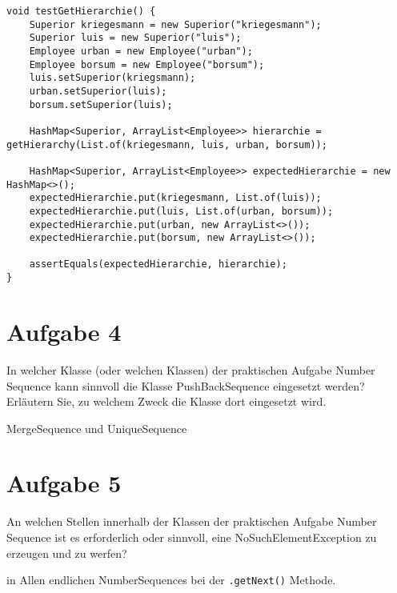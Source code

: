 \begin{lstlisting}
void testGetHierarchie() {
    Superior kriegesmann = new Superior("kriegesmann");
    Superior luis = new Superior("luis");
    Employee urban = new Employee("urban");
    Employee borsum = new Employee("borsum");
    luis.setSuperior(kriegsmann);
    urban.setSuperior(luis);
    borsum.setSuperior(luis);

    HashMap<Superior, ArrayList<Employee>> hierarchie = getHierarchy(List.of(kriegesmann, luis, urban, borsum));
    
    HashMap<Superior, ArrayList<Employee>> expectedHierarchie = new HashMap<>();
    expectedHierarchie.put(kriegesmann, List.of(luis));
    expectedHierarchie.put(luis, List.of(urban, borsum));
    expectedHierarchie.put(urban, new ArrayList<>());
    expectedHierarchie.put(borsum, new ArrayList<>());

    assertEquals(expectedHierarchie, hierarchie);
}
\end{lstlisting}

\section{Aufgabe 4}
In welcher Klasse (oder welchen Klassen) der praktischen Aufgabe Number
Sequence kann sinnvoll die Klasse PushBackSequence eingesetzt werden? Erläutern
Sie, zu welchem Zweck die Klasse dort eingesetzt wird.

MergeSequence und UniqueSequence

\section{Aufgabe 5}
An welchen Stellen innerhalb der Klassen der praktischen Aufgabe Number
Sequence ist es erforderlich oder sinnvoll, eine NoSuchElementException zu
erzeugen und zu werfen?

in Allen endlichen NumberSequences bei der \lstinline{.getNext()} Methode.
